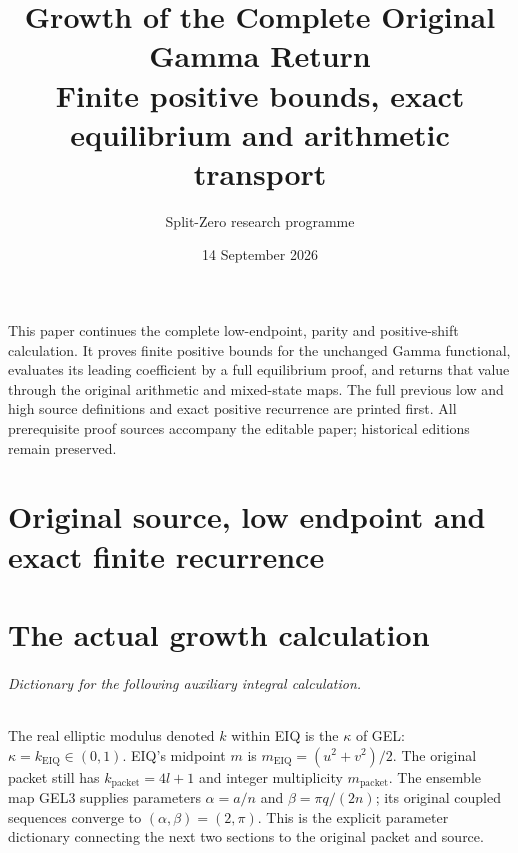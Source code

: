 \documentclass[11pt,a4paper]{article}
\title{Growth of the Complete Original Gamma Return\\[3pt]
\large Finite positive bounds, exact equilibrium and arithmetic transport}
\author{Split-Zero research programme}
\date{14 September 2026}
\begin{document}
\maketitle
This paper continues the complete low-endpoint, parity and positive-shift
calculation. It proves finite positive bounds for the unchanged Gamma
functional, evaluates its leading coefficient by a full equilibrium proof,
and returns that value through the original arithmetic and mixed-state maps.
The full previous low and high source definitions and exact positive
recurrence are printed first. All prerequisite proof sources accompany
the editable paper; historical editions remain preserved.

\part*{Original source, low endpoint and exact finite recurrence}

\clearpage

\clearpage
\part*{The actual growth calculation}

\clearpage

\clearpage
\paragraph{Dictionary for the following auxiliary integral calculation.}
The real elliptic modulus denoted $k$ within EIQ is the $\kappa$ of GEL:
$\kappa=k_{\mathrm{EIQ}}\in(0,1)$. EIQ's midpoint $m$ is
$m_{\mathrm{EIQ}}=(u^2+v^2)/2$. The original packet still has
$k_{\mathrm{packet}}=4l+1$ and integer multiplicity $m_{\mathrm{packet}}$.
The ensemble map GEL3 supplies parameters $\alpha=a/n$ and
$\beta=\pi q/(2n)$; its original coupled sequences converge to
$(\alpha,\beta)=(2,\pi)$. This is the explicit parameter dictionary
connecting the next two sections to the original packet and source.

\clearpage

\clearpage

\end{document}

